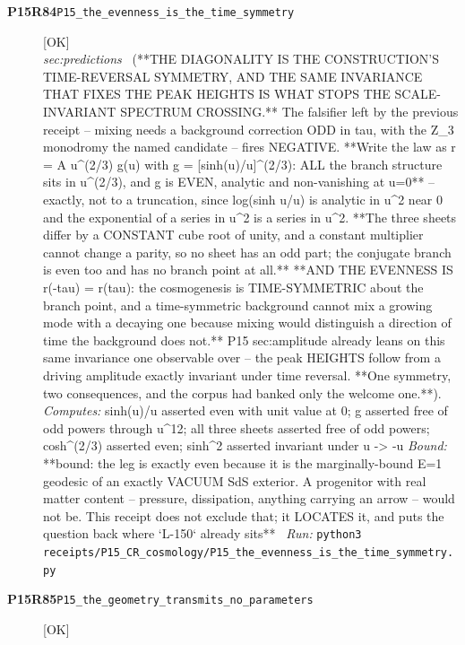 \begin{description}
\item[\textbf{P15R84}\quad\texttt{P15\_the\_evenness\_is\_the\_time\_symmetry}]\hfill\textsf{[OK]}\\
\textit{sec:predictions} \ (**THE DIAGONALITY IS THE CONSTRUCTION'S TIME-REVERSAL SYMMETRY, AND THE SAME INVARIANCE THAT FIXES THE PEAK HEIGHTS IS WHAT STOPS THE SCALE-INVARIANT SPECTRUM CROSSING.** The falsifier left by the previous receipt -- mixing needs a background correction ODD in tau, with the Z\_3 monodromy the named candidate -- fires NEGATIVE. **Write the law as r = A u\textasciicircum{}(2/3) g(u) with g = [sinh(u)/u]\textasciicircum{}(2/3): ALL the branch structure sits in u\textasciicircum{}(2/3), and g is EVEN, analytic and non-vanishing at u=0** -- exactly, not to a truncation, since log(sinh u/u) is analytic in u\textasciicircum{}2 near 0 and the exponential of a series in u\textasciicircum{}2 is a series in u\textasciicircum{}2. **The three sheets differ by a CONSTANT cube root of unity, and a constant multiplier cannot change a parity, so no sheet has an odd part; the conjugate branch is even too and has no branch point at all.** **AND THE EVENNESS IS r(-tau) = r(tau): the cosmogenesis is TIME-SYMMETRIC about the branch point, and a time-symmetric background cannot mix a growing mode with a decaying one because mixing would distinguish a direction of time the background does not.** P15 sec:amplitude already leans on this same invariance one observable over -- the peak HEIGHTS follow from a driving amplitude exactly invariant under time reversal. **One symmetry, two consequences, and the corpus had banked only the welcome one.**). 
\emph{Computes:} sinh(u)/u asserted even with unit value at 0; g asserted free of odd powers through u\textasciicircum{}12; all three sheets asserted free of odd powers; cosh\textasciicircum{}(2/3) asserted even; sinh\textasciicircum{}2 asserted invariant under u -> -u
 \emph{Bound:} **bound: the leg is exactly even because it is the marginally-bound E=1 geodesic of an exactly VACUUM SdS exterior. A progenitor with real matter content -- pressure, dissipation, anything carrying an arrow -- would not be. This receipt does not exclude that; it LOCATES it, and puts the question back where `L-150` already sits**
\ \emph{Run:} \texttt{python3 receipts/P15\_CR\_cosmology/P15\_the\_evenness\_is\_the\_time\_symmetry.py}
\item[\textbf{P15R85}\quad\texttt{P15\_the\_geometry\_transmits\_no\_parameters}]\hfill\textsf{[OK]}\\

\end{description}
